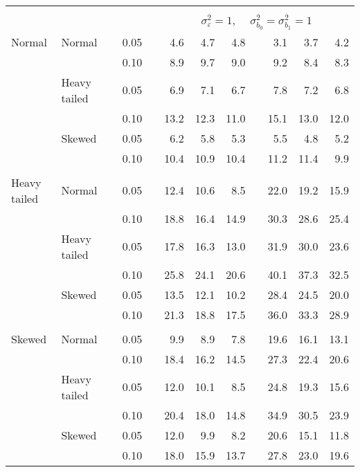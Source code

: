 \begin{table}[ht]
\begin{scriptsize}
\begin{tabular}{ll p{.1cm} c p{.1cm} rrr p{.1cm} rrr}
&&&&&&&&&&&\\
& && && \multicolumn{7}{c}{$\sigma_{\varepsilon}^2 = 1$, \ \ $\sigma_{b_0}^2 = \sigma_{b_1}^2 = 1$} \\ \cline{6-12}
\rowcolor{gray!20} Normal & Normal &  & 0.05 &  & 4.6 & 4.7 & 4.8 &  & 3.1 & 3.7 & 4.2 \\ 
\rowcolor{gray!20}    &  &  & 0.10 &  & 8.9 & 9.7 & 9.0 &  & 9.2 & 8.4 & 8.3 \\ 
\rowcolor{gray!20}    & Heavy tailed &  & 0.05 &  & 6.9 & 7.1 & 6.7 &  & 7.8 & 7.2 & 6.8 \\ 
\rowcolor{gray!20}    &  &  & 0.10 &  & 13.2 & 12.3 & 11.0 &  & 15.1 & 13.0 & 12.0 \\ 
\rowcolor{gray!20}    & Skewed &  & 0.05 &  & 6.2 & 5.8 & 5.3 &  & 5.5 & 4.8 & 5.2 \\ 
\rowcolor{gray!20}    &  &  & 0.10 &  & 10.4 & 10.9 & 10.4 &  & 11.2 & 11.4 & 9.9 \\ 
&&&&&&&&&&&\\
  Heavy tailed & Normal &  & 0.05 &  & 12.4 & 10.6 & 8.5 &  & 22.0 & 19.2 & 15.9 \\ 
   &  &  & 0.10 &  & 18.8 & 16.4 & 14.9 &  & 30.3 & 28.6 & 25.4 \\ 
   & Heavy tailed &  & 0.05 &  & 17.8 & 16.3 & 13.0 &  & 31.9 & 30.0 & 23.6 \\ 
   &  &  & 0.10 &  & 25.8 & 24.1 & 20.6 &  & 40.1 & 37.3 & 32.5 \\ 
   & Skewed &  & 0.05 &  & 13.5 & 12.1 & 10.2 &  & 28.4 & 24.5 & 20.0 \\ 
   &  &  & 0.10 &  & 21.3 & 18.8 & 17.5 &  & 36.0 & 33.3 & 28.9 \\ 
&&&&&&&&&&&\\
  Skewed & Normal &  & 0.05 &  & 9.9 & 8.9 & 7.8 &  & 19.6 & 16.1 & 13.1 \\ 
   &  &  & 0.10 &  & 18.4 & 16.2 & 14.5 &  & 27.3 & 22.4 & 20.6 \\ 
   & Heavy tailed &  & 0.05 &  & 12.0 & 10.1 & 8.5 &  & 24.8 & 19.3 & 15.6 \\ 
   &  &  & 0.10 &  & 20.4 & 18.0 & 14.8 &  & 34.9 & 30.5 & 23.9 \\ 
   & Skewed &  & 0.05 &  & 12.0 & 9.9 & 8.2 &  & 20.6 & 15.1 & 11.8 \\ 
   &  &  & 0.10 &  & 18.0 & 15.9 & 13.7 &  & 27.8 & 23.0 & 19.6 \\ 


\end{tabular}
\end{scriptsize}
\end{table}
